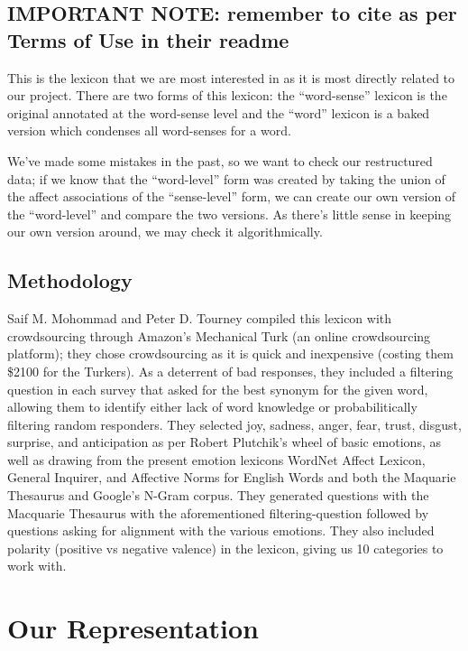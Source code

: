 \documentclass[11pt, twoside, reqno]{book}
\begin{document}
\subsection{IMPORTANT NOTE: remember to cite as per Terms of Use in their readme}

This is the lexicon that we are most interested in as it is most directly related to our project. There are two forms of this lexicon: the ``word-sense'' lexicon is the original annotated at the word-sense level and the ``word'' lexicon is a baked version which condenses all word-senses for a word.

We've made some mistakes in the past, so we want to check our restructured data; if we know that the ``word-level'' form was created by taking the union of the affect associations of the ``sense-level'' form, we can create our own version of the ``word-level'' and compare the two versions. As there's little sense in keeping our own version around, we may check it algorithmically.

\subsection{Methodology}

Saif M. Mohommad and Peter D. Tourney compiled this lexicon with crowdsourcing through Amazon's Mechanical Turk (an online crowdsourcing platform); they chose crowdsourcing as it is quick and inexpensive (costing them \$2100 for the Turkers). As a deterrent of bad responses, they included a filtering question in each survey that asked for the best synonym for the given word, allowing them to identify either lack of word knowledge or probabilitically filtering random responders. They selected joy, sadness, anger, fear, trust, disgust, surprise, and anticipation as per Robert Plutchik's wheel of basic emotions, as well as drawing from the present emotion lexicons WordNet Affect Lexicon, General Inquirer, and Affective Norms for English Words and both the Maquarie Thesaurus and Google's N-Gram corpus. They generated questions with the Macquarie Thesaurus with the aforementioned filtering-question followed by questions asking for alignment with the various emotions. They also included polarity (positive vs negative valence) in the lexicon, giving us 10 categories to work with.

\section{Our Representation}
\end{document}
